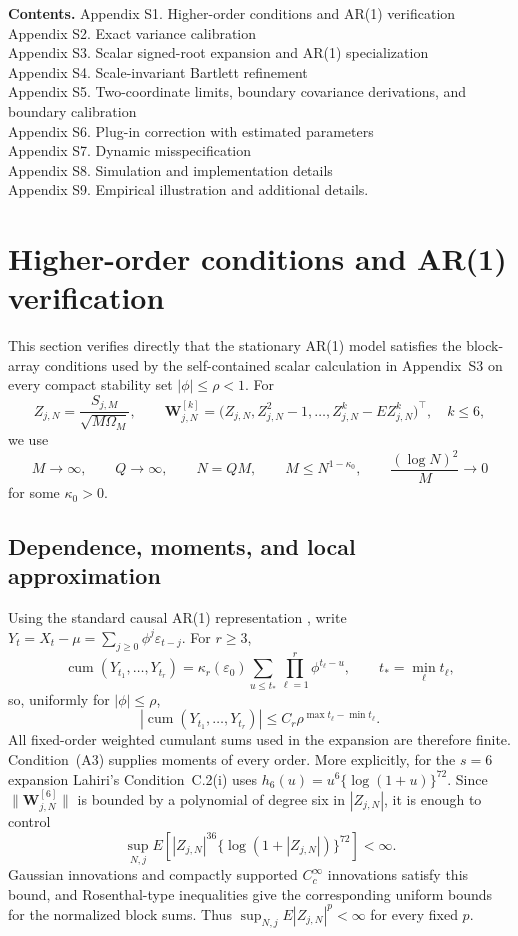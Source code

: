\documentclass[12pt]{article}
\theoremstyle{remark}
\begin{document}
\medskip
\noindent\textbf{Contents.}
Appendix S1. Higher-order conditions and AR(1) verification\\
Appendix S2. Exact variance calibration\\
Appendix S3. Scalar signed-root expansion and AR(1) specialization\\
Appendix S4. Scale-invariant Bartlett refinement\\
Appendix S5. Two-coordinate limits, boundary covariance derivations, and boundary calibration\\
Appendix S6. Plug-in correction with estimated parameters\\
Appendix S7. Dynamic misspecification\\
Appendix S8. Simulation and implementation details\\
Appendix S9. Empirical illustration and additional details.

\section{Higher-order conditions and AR(1) verification}
\label{supp:conditions}
This section verifies directly that the stationary AR(1) model satisfies the block-array conditions used by the self-contained scalar calculation in Appendix~S3 on every compact stability set $|\phi|\le\rho<1$. For
\[
Z_{j,N}=\frac{S_{j,M}}{\sqrt{M\Omega_M}},
\qquad
\mathbf W^{[k]}_{j,N}
=\bigl(Z_{j,N},Z_{j,N}^2-1,\ldots,Z_{j,N}^k-EZ_{j,N}^k\bigr)^\top,
\quad k\le6,
\]
we use
\begin{equation}
M\to\infty,\qquad Q\to\infty,\qquad N=QM,\qquad
M\le N^{1-\kappa_0},\qquad \frac{(\log N)^2}{M}\to0
\label{eq:supp-block-growth}
\end{equation}
for some $\kappa_0>0$.

\subsection{Dependence, moments, and local approximation}
Using the standard causal AR(1) representation \citep[Ch.~3]{Brockwell.Davis:1991}, write $Y_t=X_t-\mu=\sum_{j\ge0}\phi^j\varepsilon_{t-j}$. For $r\ge3$,
\[
\operatorname{cum}(Y_{t_1},\ldots,Y_{t_r})
=\kappa_r(\varepsilon_0)\sum_{u\le t_*}\prod_{\ell=1}^r\phi^{t_\ell-u},
\qquad t_*=\min_\ell t_\ell,
\]
so, uniformly for $|\phi|\le\rho$,
\begin{equation*}
|\operatorname{cum}(Y_{t_1},\ldots,Y_{t_r})|
\le C_r\rho^{\max t_\ell-\min t_\ell}.
\end{equation*}
All fixed-order weighted cumulant sums used in the expansion are therefore finite. Condition~(A3) supplies moments of every order. More explicitly, for the $s=6$ expansion Lahiri's Condition~C.2(i) uses $h_6(u)=u^6\{\log(1+u)\}^{72}$. Since $\|\mathbf W^{[6]}_{j,N}\|$ is bounded by a polynomial of degree six in $|Z_{j,N}|$, it is enough to control
\[
\sup_{N,j}E\left[|Z_{j,N}|^{36}\{\log(1+|Z_{j,N}|)\}^{72}\right]<\infty.
\]
Gaussian innovations and compactly supported $C_c^\infty$ innovations satisfy this bound, and Rosenthal-type inequalities give the corresponding uniform bounds for the normalized block sums. Thus $\sup_{N,j}E|Z_{j,N}|^p<\infty$ for every fixed $p$.
\end{document}
